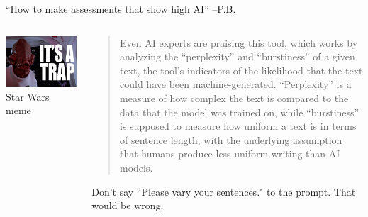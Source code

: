 \documentclass[aspectratio=169]{beamer}
\begin{document}
\begin{frame}{``How to make assessments that show high AI'' --P.B.}
\begin{columns}[t]
\begin{column}{.4\textwidth}
    \centering
    \includegraphics[width=\textwidth]{Figures/itsatrap-2.jpg}
    Star Wars meme
\end{column}
\begin{column}{.6\textwidth}
\begin{quote}
    Even AI experts are praising this tool, which works by analyzing the “perplexity” and “burstiness” of a given text, the tool’s indicators of the likelihood that the text could have been machine-generated. “Perplexity” is a measure of how complex the text is compared to the data that the model was trained on, while “burstiness” is supposed to measure how uniform a text is in terms of sentence length, with the underlying assumption that humans produce less uniform writing than AI models. \parencite{Rikab2023-am}
\end{quote}

Don't say ``Please vary your sentences." to the prompt. That would be wrong. 
\end{column}
\end{columns}
\end{frame}
\end{document}
